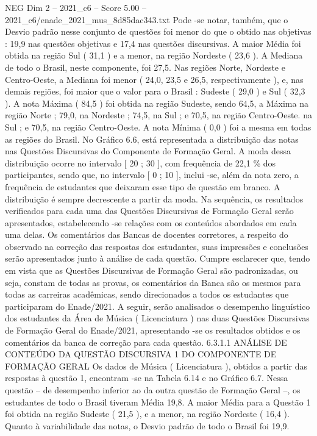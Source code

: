 \begin{textsample}{NEG Dim 2 – 2021\_c6 – Score 5.00 – 2021\_c6/enade\_2021\_mus\_8d85dac343.txt}
Pode -se notar, também, que o Desvio padrão nesse conjunto de questões foi menor do que o obtido nas objetivas : 19,9 nas questões objetivas e 17,4 nas questões discursivas.
A maior Média foi obtida na região Sul ( 31,1 ) e a menor, na região Nordeste ( 23,6 ).
A Mediana de todo o Brasil, neste componente, foi 27,5.
Nas regiões Norte, Nordeste e Centro-Oeste, a Mediana foi menor ( 24,0, 23,5 e 26,5, respectivamente ), e, nas demais regiões, foi maior que o valor para o Brasil : Sudeste ( 29,0 ) e Sul ( 32,3 ).
A nota Máxima ( 84,5 ) foi obtida na região Sudeste, sendo 64,5, a Máxima na região Norte ; 79,0, na Nordeste ; 74,5, na Sul ; e 70,5, na região Centro-Oeste. na Sul ; e 70,5, na região Centro-Oeste.
A nota Mínima ( 0,0 ) foi a mesma em todas as regiões do Brasil.
No Gráfico 6.6, está representada a distribuição das notas nas Questões Discursivas do Componente de Formação Geral.
A moda dessa distribuição ocorre no intervalo [ 20 ; 30 ], com frequência de 22,1 \% dos participantes, sendo que, no intervalo [ 0 ; 10 ], inclui -se, além da nota zero, a frequência de estudantes que deixaram esse tipo de questão em branco.
A distribuição é sempre decrescente a partir da moda.
Na sequência, os resultados verificados para cada uma das Questões Discursivas de Formação Geral serão apresentados, estabelecendo -se relações com os conteúdos abordados em cada uma delas.
Os comentários das Bancas de docentes corretores, a respeito do observado na correção das respostas dos estudantes, suas impressões e conclusões serão apresentados junto à análise de cada questão.
Cumpre esclarecer que, tendo em vista que as Questões Discursivas de Formação Geral são padronizadas, ou seja, constam de todas as provas, os comentários da Banca são os mesmos para todas as carreiras acadêmicas, sendo direcionados a todos os estudantes que participaram do Enade/2021.
A seguir, serão analisados o desempenho linguístico dos estudantes da Área de Música ( Licenciatura ) nas duas Questões Discursivas de Formação Geral do Enade/2021, apresentando -se os resultados obtidos e os comentários da banca de correção para cada questão. 6.3.1.1 ANÁLISE DE CONTEÚDO DA QUESTÃO DISCURSIVA 1 DO COMPONENTE DE FORMAÇÃO GERAL Os dados de Música ( Licenciatura ), obtidos a partir das respostas à questão 1, encontram -se na Tabela 6.14 e no Gráfico 6.7.
Nessa questão – de desempenho inferior ao da outra questão de Formação Geral –, os estudantes de todo o Brasil tiveram Média 19,8.
A maior Média para a Questão 1 foi obtida na região Sudeste ( 21,5 ), e a menor, na região Nordeste ( 16,4 ).
Quanto à variabilidade das notas, o Desvio padrão de todo o Brasil foi 19,9.

\end{textsample}
